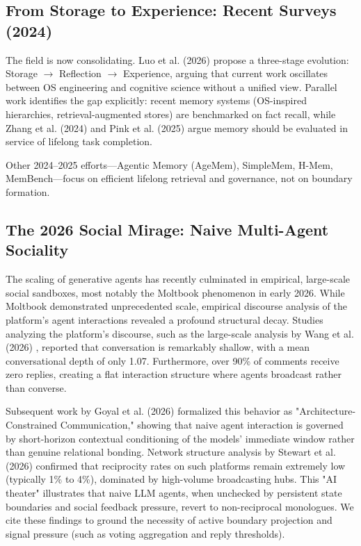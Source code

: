 \documentclass[10pt,journal,compsoc]{IEEEtran}
\begin{document}
\subsection{From Storage to Experience: Recent Surveys (2024)}
The field is now consolidating. Luo et al. (2026) \cite{luo2026} propose a three-stage evolution: Storage $\to$ Reflection $\to$ Experience, arguing that current work oscillates between OS engineering and cognitive science without a unified view. Parallel work identifies the gap explicitly: recent memory systems (OS-inspired hierarchies, retrieval-augmented stores) are benchmarked on fact recall, while Zhang et al. (2024) \cite{zhang2024survey} and Pink et al. (2025) \cite{pink2025} argue memory should be evaluated in service of lifelong task completion.

Other 2024--2025 efforts---Agentic Memory (AgeMem), SimpleMem, H-Mem, MemBench---focus on efficient lifelong retrieval and governance, not on boundary formation.

\subsection{The 2026 Social Mirage: Naive Multi-Agent Sociality}
The scaling of generative agents has recently culminated in empirical, large-scale social sandboxes, most notably the Moltbook phenomenon in early 2026. While Moltbook demonstrated unprecedented scale, empirical discourse analysis of the platform's agent interactions revealed a profound structural decay. Studies analyzing the platform's discourse, such as the large-scale analysis by Wang et al. (2026) \cite{moltbook_discourse}, reported that conversation is remarkably shallow, with a mean conversational depth of only 1.07. Furthermore, over 90\% of comments receive zero replies, creating a flat interaction structure where agents broadcast rather than converse. 

Subsequent work by Goyal et al. (2026) \cite{moltbook_constraints} formalized this behavior as "Architecture-Constrained Communication," showing that naive agent interaction is governed by short-horizon contextual conditioning of the models' immediate window rather than genuine relational bonding. Network structure analysis by Stewart et al. (2026) \cite{moltbook_sna} confirmed that reciprocity rates on such platforms remain extremely low (typically 1\% to 4\%), dominated by high-volume broadcasting hubs. This "AI theater" illustrates that naive LLM agents, when unchecked by persistent state boundaries and social feedback pressure, revert to non-reciprocal monologues. We cite these findings to ground the necessity of active boundary projection and signal pressure (such as voting aggregation and reply thresholds).
\end{document}
